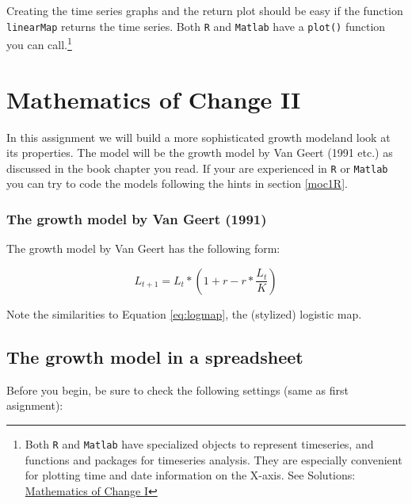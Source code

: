 \documentclass[]{book}
\let\rmarkdownfootnote\footnote%
\def\footnote{\protect\rmarkdownfootnote}
\let\stdsection\section
\renewcommand\section{\newpage\stdsection}
\begin{document}
Creating the time series graphs and the return plot should be easy if
the function \texttt{linearMap} returns the time series. Both \texttt{R}
and \texttt{Matlab} have a \texttt{plot()} function you can
call.\footnote{Both \texttt{R} and \texttt{Matlab} have specialized
  objects to represent timeseries, and functions and packages for
  timeseries analysis. They are especially convenient for plotting time
  and date information on the X-axis. See Solutions:
  \protect\hyperlink{moc1Rsol}{Mathematics of Change I}}

\chapter{\texorpdfstring{\textbf{Mathematics of Change
II}}{Mathematics of Change II}}\label{moc2ass}

In this assignment we will build a more sophisticated growth modeland
look at its properties. The model will be the growth model by Van Geert
(1991 etc.) as discussed in the book chapter you read. If your are
experienced in \texttt{R} or \texttt{Matlab} you can try to code the
models following the hints in section \ref{moc1R}.

\subsection{The growth model by Van Geert
(1991)}\label{the-growth-model-by-van-geert-1991}

The growth model by Van Geert has the following form:

\begin{equation}
L_{t+1} = L_t * (1 + r - r * \frac{L_t}{K})
\label{eq:vanG}
\end{equation}

Note the similarities to Equation \eqref{eq:logmap}, the (stylized)
logistic map.

\section{The growth model in a
spreadsheet}\label{the-growth-model-in-a-spreadsheet}

Before you begin, be sure to check the following settings (same as first
asignment):
\end{document}
